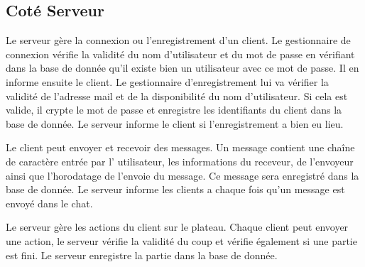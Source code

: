 \subsection{Coté Serveur}


Le serveur gère la connexion ou l'enregistrement d'un client. 
Le gestionnaire de connexion vérifie la validité du nom d'utilisateur et
du mot de passe en vérifiant dans la base de donnée qu'il existe bien un utilisateur avec ce mot de passe. Il en informe ensuite le client.
Le gestionnaire d'enregistrement lui va vérifier la validité de l'adresse mail et de la disponibilité du nom d'utilisateur. Si cela est valide, il crypte le mot de passe et enregistre les identifiants du client dans la base de donnée. Le serveur informe le client si l'enregistrement a bien eu lieu.

Le client peut envoyer et recevoir des messages.
Un message contient une chaîne de caractère entrée par l' utilisateur, les informations du receveur, de l'envoyeur ainsi que l'horodatage de l'envoie du message. Ce message sera enregistré dans la base de donnée. Le serveur informe les clients a chaque fois qu'un message est envoyé dans le chat.

Le serveur gère les actions du client sur le plateau.
Chaque client peut envoyer une action, le serveur vérifie la validité du coup et vérifie également si une partie est fini. Le serveur enregistre la partie dans la base de donnée.

